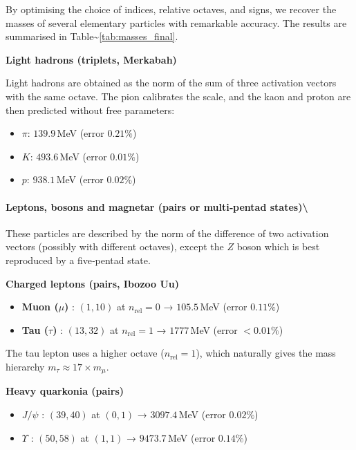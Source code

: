 \documentclass[11pt]{article}
\providecommand{\tightlist}{\setlength{\itemsep}{2pt}\setlength{\parskip}{6pt}}
\providecommand{\tightlist}{%
  \setlength{\itemsep}{2pt}\setlength{\parskip}{6pt}
}
\begin{document}
By optimising the choice of indices, relative octaves, and signs, we
recover the masses of several elementary particles with remarkable
accuracy. The results are summarised in
Table\textasciitilde{}\ref{tab:masses_final}.

\textbf{Light hadrons (triplets, Merkabah)}

Light hadrons are obtained as the norm of the sum of three activation
vectors with the same octave. The pion calibrates the scale, and the
kaon and proton are then predicted without free parameters:

\begin{itemize}
\tightlist
\item
  \(\pi\): \(139.9\)\,MeV (error \(0.21\%\))
\item
  \(K\): \(493.6\)\,MeV (error \(0.01\%\))
\item
  \(p\): \(938.1\)\,MeV (error \(0.02\%\))
\end{itemize}

\hypertarget{leptons-bosons-and-magnetar-pairs-or-multipentad-states}{%
\paragraph{Leptons, bosons and magnetar (pairs or multi‑pentad
states)\textbackslash{}}\label{leptons-bosons-and-magnetar-pairs-or-multipentad-states}}

These particles are described by the norm of the difference of two
activation vectors (possibly with different octaves), except the \(Z\)
boson which is best reproduced by a five‑pentad state.

\textbf{Charged leptons (pairs, Ibozoo Uu)}

\begin{itemize}
\tightlist
\item
  \textbf{Muon (\(\mu\))} : \((1,10)\) at \(n_{\text{rel}}=0\) →
  \(105.5\)\,MeV (error \(0.11\%\))
\item
  \textbf{Tau (\(\tau\))} : \((13,32)\) at \(n_{\text{rel}}=1\) →
  \(1777\)\,MeV (error \(<0.01\%\))
\end{itemize}

The tau lepton uses a higher octave (\(n_{\text{rel}}=1\)), which
naturally gives the mass hierarchy \(m_\tau \approx 17 \times m_\mu\).

\textbf{Heavy quarkonia (pairs)}

\begin{itemize}
\tightlist
\item
  \textbf{\(J/\psi\)} : \((39,40)\) at \((0,1)\) → \(3097.4\)\,MeV
  (error \(0.02\%\))
\item
  \textbf{\(\Upsilon\)} : \((50,58)\) at \((1,1)\) → \(9473.7\)\,MeV
  (error \(0.14\%\))
\end{itemize}
\end{document}
